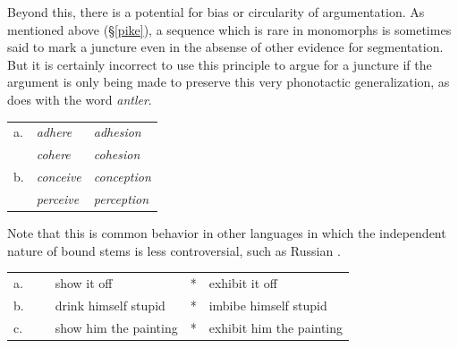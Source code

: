 Beyond this, there is a potential for bias or circularity of argumentation. As mentioned above (\S\ref{pike}), a sequence which is rare in monomorphs is sometimes said to mark a juncture even in the absense of other evidence for segmentation. But it is certainly incorrect to use this principle to argue for a juncture if the argument is only being made to preserve this very phonotactic generalization, as \citet[186]{Pierrehumbert1994} does with the word \emph{antler}. 


\begin{example}
\begin{tabular}{l l l}
a. & \emph{adhere}   & \emph{adhesion}   \\
   & \emph{cohere}   & \emph{cohesion}   \\
b. & \emph{conceive} & \emph{conception} \\
   & \emph{perceive} & \emph{perception} \\
\end{tabular}
\end{example}

Note that this is common behavior in other languages in which the independent nature of bound stems is less controversial, such as Russian \citep{Pesetsky1977}.


\begin{example}
\begin{tabular}{l l@{} l l l@{}}
a. & ~ & {show it off}           & * & {exhibit it off}           \\
b. & ~ & {drink himself stupid}  & * & {imbibe himself stupid}    \\
c. & ~ & {show him the painting} & * & {exhibit him the painting} \\
\end{tabular}
\end{example}

